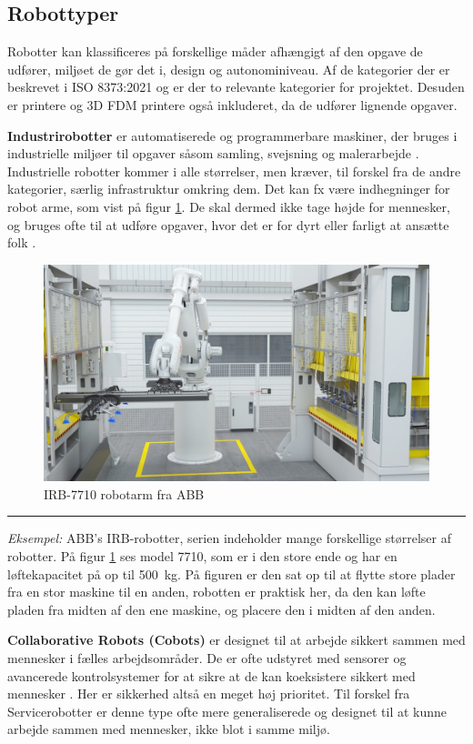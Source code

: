 \subsection{Robottyper} \label{Robottyper}
Robotter kan klassificeres på forskellige måder afhængigt af den opgave de udfører, miljøet de gør det i, design og autonominiveau. Af de kategorier der er beskrevet i ISO 8373:2021 \parencite{ISO2021ISOVocabulary} og \cite{IFR2023World2023} er der to relevante kategorier for projektet. Desuden er printere og 3D FDM printere også inkluderet, da de udfører lignende opgaver.

\textbf{Industrirobotter} er automatiserede og programmerbare maskiner, der bruges i industrielle miljøer til opgaver såsom samling, svejsning og malerarbejde \parencite{IFR2023World2023}. Industrielle robotter kommer i alle størrelser, men kræver, til forskel fra de andre kategorier, særlig infrastruktur omkring dem. Det kan fx være indhegninger for robot arme, som vist på figur \ref{fig:irb7710pic}. De skal dermed ikke tage højde for mennesker, og bruges ofte til at udføre opgaver, hvor det er for dyrt eller farligt at ansætte folk \parencite{ABB2023IRBSeries, ISO2021ISOVocabulary}. 

\begin{figure}[H]
    \centering
    \includegraphics[width=0.6
    \textwidth]{Sections/2 Problemanalyse/Media/irb7710.jpg}
    \caption{IRB-7710 robotarm fra ABB \parencite{ABB2023IRBSeries}}
    \label{fig:irb7710pic}
\end{figure} \plainbreak{-0.5}
\textit{Eksempel:} ABB's IRB-robotter, serien indeholder mange forskellige størrelser af robotter. På figur \ref{fig:irb7710pic} ses model 7710, som er i den store ende og har en løftekapacitet på op til \SI{500}{kg}. På figuren er den sat op til at flytte store plader fra en stor maskine til en anden, robotten er praktisk her, da den kan løfte pladen fra midten af den ene maskine, og placere den i midten af den anden.
    
\textbf{Collaborative Robots (Cobots)} er designet til at arbejde sikkert sammen med mennesker i fælles arbejdsområder. De er ofte udstyret med sensorer og avancerede kontrolsystemer for at sikre at de kan koeksistere sikkert med mennesker \parencite{IFR2023World2023}. Her er sikkerhed altså en meget høj prioritet. Til forskel fra Servicerobotter er denne type ofte mere generaliserede og designet til at kunne arbejde sammen med mennesker, ikke blot i samme miljø.

